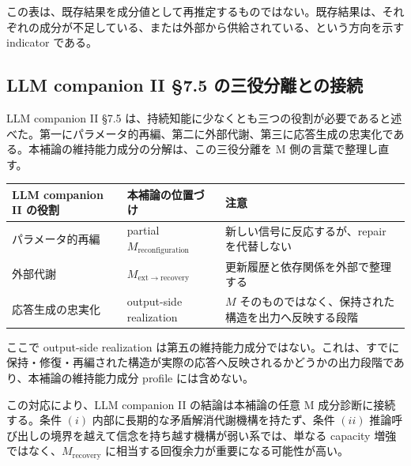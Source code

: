 \documentclass[12pt,a4paper]{article}
\begin{document}
この表は、既存結果を成分値として再推定するものではない。既存結果は、それぞれの成分が不足している、または外部から供給されている、という方向を示す indicator である。

\subsection{LLM companion II §7.5 の三役分離との接続}\label{llm-companion-ii-7.5-ux306eux4e09ux5f79ux5206ux96e2ux3068ux306eux63a5ux7d9a}

LLM companion II §7.5 は、持続知能に少なくとも三つの役割が必要であると述べた。第一にパラメータ的再編、第二に外部代謝、第三に応答生成の忠実化である。本補論の維持能力成分の分解は、この三役分離を M 側の言葉で整理し直す。

{\def\LTcaptype{table} %
\begin{longtable}[]{@{}
  >{\raggedright\arraybackslash}p{}
  >{\raggedright\arraybackslash}p{}
  >{\raggedright\arraybackslash}p{}@{}}
\toprule\noalign{}
\begin{minipage}[b]{\linewidth}\raggedright
LLM companion II の役割
\end{minipage} & \begin{minipage}[b]{\linewidth}\raggedright
本補論の位置づけ
\end{minipage} & \begin{minipage}[b]{\linewidth}\raggedright
注意
\end{minipage} \\
\midrule\noalign{}
\endhead
\bottomrule\noalign{}
\endlastfoot
パラメータ的再編 & partial \(M_{\mathrm{reconfiguration}}\) & 新しい信号に反応するが、repair を代替しない \\
外部代謝 & \(M_{\mathrm{ext}\to\mathrm{recovery}}\) & 更新履歴と依存関係を外部で整理する \\
応答生成の忠実化 & output-side realization & \(M\) そのものではなく、保持された構造を出力へ反映する段階 \\
\end{longtable}
}

ここで output-side realization は第五の維持能力成分ではない。これは、すでに保持・修復・再編された構造が実際の応答へ反映されるかどうかの出力段階であり、本補論の維持能力成分 profile には含めない。

この対応により、LLM companion II の結論は本補論の任意 M 成分診断に接続する。条件 \((i)\) 内部に長期的な矛盾解消代謝機構を持たず、条件 \((ii)\) 推論呼び出しの境界を越えて信念を持ち越す機構が弱い系では、単なる capacity 増強ではなく、\(M_{\mathrm{recovery}}\) に相当する回復余力が重要になる可能性が高い。
\end{document}
